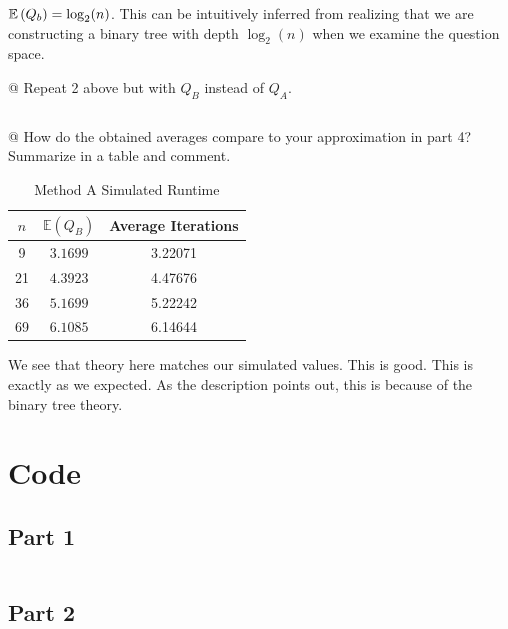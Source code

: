\documentclass[11pt]{article}
\begin{document}
\begin{easylist}[enumerate]
    \vspace{0.25cm}
    $\mathbb{E}\left( Q_b \right) = \log_2(n)$. This can be intuitively inferred from
    realizing that we are constructing a binary tree with depth $\log_2(n)$ when
    we examine the question space.

    @ Repeat 2 above but with $Q_B$ instead of $Q_A$.

    \weave
    \inputminted[firstline=27,lastline=49]{python}{lab1_part2.py}
    \noweave

    @ How do the obtained averages compare to your approximation in part 4?
    Summarize in a table and comment.

    \begin{table}[H]
        \centering
        \begin{tabular}{|c|c|c|}
            \hline
            $n$ & $\mathbb{E}(Q_B)$ & Average Iterations\\
            \hline
            9  & $3.1699$ & 3.22071\\
            21 & $4.3923$ & 4.47676\\
            36 & $5.1699$ & 5.22242\\
            69 & $6.1085$ & 6.14644\\
            \hline
        \end{tabular}
        \caption{Method A Simulated Runtime}
        \label{table:methoda}
    \end{table}

    We see that theory here matches our simulated values. This is good. This is
    exactly as we expected. As the description points out, this is because of
    the binary tree theory.

\end{easylist}

\newpage
\appendix
\section{Code}\label{app:code}

\subsection{Part 1}
\inputminted{python}{lab1_part1.py}

\subsection{Part 2}
\inputminted{python}{lab1_part2.py}
\end{document}
